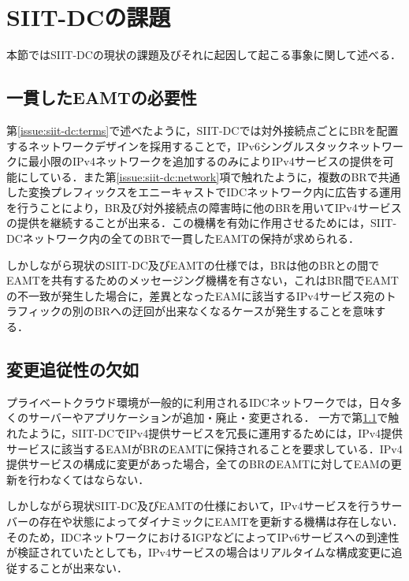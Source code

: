 \section{SIIT-DCの課題}
\label{issue:siit-dc_problems}
本節ではSIIT-DCの現状の課題及びそれに起因して起こる事象に関して述べる．

\subsection{一貫したEAMTの必要性}
\label{issue:siit-dc_problems:consistent}
第\ref{issue:siit-dc:terms}で述べたように，SIIT-DCでは対外接続点ごとにBRを配置するネットワークデザインを採用することで，IPv6シングルスタックネットワークに最小限のIPv4ネットワークを追加するのみによりIPv4サービスの提供を可能にしている．また第\ref{issue:siit-dc:network}項で触れたように，複数のBRで共通した変換プレフィックスをエニーキャストでIDCネットワーク内に広告する運用を行うことにより，BR及び対外接続点の障害時に他のBRを用いてIPv4サービスの提供を継続することが出来る．この機構を有効に作用させるためには，SIIT-DCネットワーク内の全てのBRで一貫したEAMTの保持が求められる．

しかしながら現状のSIIT-DC及びEAMTの仕様\cite{RFC7755,RFC7756,RFC7757}では，BRは他のBRとの間でEAMTを共有するためのメッセージング機構を有さない，これはBR間でEAMTの不一致が発生した場合に，差異となったEAMに該当するIPv4サービス宛のトラフィックの別のBRへの迂回が出来なくなるケースが発生することを意味する．


\subsection{変更追従性の欠如}
プライベートクラウド環境が一般的に利用されるIDCネットワークでは，日々多くのサーバーやアプリケーションが追加・廃止・変更される．
一方で第\ref{issue:siit-dc_problems:consistent}で触れたように，SIIT-DCでIPv4提供サービスを冗長に運用するためには，IPv4提供サービスに該当するEAMがBRのEAMTに保持されることを要求している．IPv4提供サービスの構成に変更があった場合，全てのBRのEAMTに対してEAMの更新を行わなくてはならない．

しかしながら現状SIIT-DC及びEAMTの仕様\cite{RFC7755,RFC7756,RFC7757}において，IPv4サービスを行うサーバーの存在や状態によってダイナミックにEAMTを更新する機構は存在しない．そのため，IDCネットワークにおけるIGPなどによってIPv6サービスへの到達性が検証されていたとしても，IPv4サービスの場合はリアルタイムな構成変更に追従することが出来ない．



